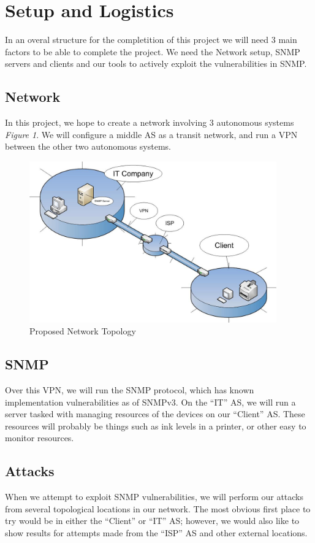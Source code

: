 \documentclass[pdftex, 11pt]{article}
\begin{document}
\section{Setup and Logistics}
In an overal structure for the completition of this project
we will need 3 main factors to be able to complete the project.
We need the Network setup, SNMP servers and clients and 
our tools to actively exploit the vulnerabilities in
SNMP.

\subsection{Network}
In this project, we hope to create a network involving 3 autonomous 
systems \emph{Figure 1}.  We will configure a middle AS as a transit  %
network, and run a VPN between the other two autonomous systems.

\begin{figure}
  \centering
  \includegraphics[width=0.95\textwidth, scale=1]{./figures/NetworkTopology.png}
  \caption{Proposed Network Topology}
\end{figure}

\subsection{SNMP}
Over this VPN, we will run the SNMP protocol, which has known 
implementation vulnerabilities as of SNMPv3. On the “IT” AS, we will 
run a server tasked with managing resources of the devices on our 
“Client” AS.  These resources will probably be things such as ink 
levels in a printer, or other easy to monitor resources.

\subsection{Attacks}
When we attempt to exploit SNMP vulnerabilities, we will perform our 
attacks from several topological locations in our network.  The most 
obvious first place to try would be in either the “Client” or “IT” AS; 
however, we would also like to show results for attempts made from 
the “ISP” AS and other external locations.
\end{document}
